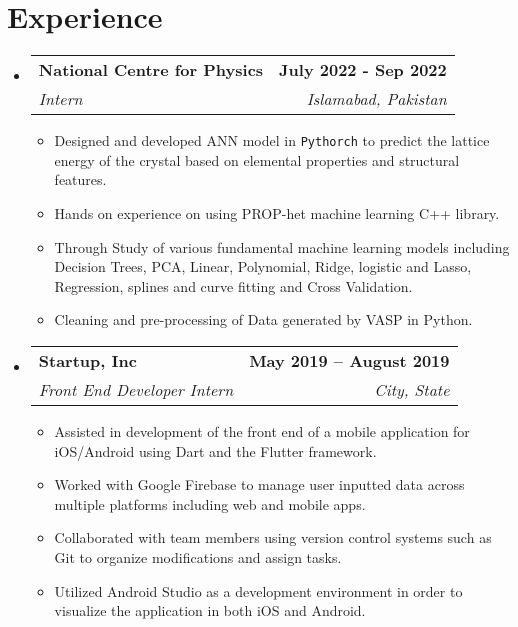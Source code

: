 \documentclass[a4paper,11pt]{article}
\makeatletter
\newcommand{\resumeItem}[1]{
  \item\small{
    {#1 \vspace{-2pt}}
  }
}
\newcommand{\resumeSubheading}[4]{
  \vspace{-2pt}\item
    \begin{tabular*}{1.0\textwidth}[t]{l@{\extracolsep{\fill}}r}
      \textbf{#1} & \textbf{\small #2} \\
      \textit{\small#3} & \textit{\small #4} \\
    \end{tabular*}\vspace{-7pt}
}
\newcommand{\resumeSubHeadingListStart}{\begin{itemize}[leftmargin=0.0in, label={}]}
\newcommand{\resumeSubHeadingListEnd}{\end{itemize}}
\newcommand{\resumeItemListStart}{\begin{itemize}}
\newcommand{\resumeItemListEnd}{\end{itemize}\vspace{-5pt}}
\makeatother
\begin{document}
\section{Experience}
  \resumeSubHeadingListStart

    \resumeSubheading
      {National Centre for Physics}{July 2022 - Sep 2022}
      {Intern}{Islamabad, Pakistan}
      \resumeItemListStart
        \resumeItem{Designed and developed ANN model in \texttt{Pythorch} to predict the lattice energy of the crystal based on elemental properties and structural features.}
        \resumeItem{Hands on experience on using PROP-het machine learning C++ library.}
        \resumeItem{Through Study of various fundamental machine learning models including Decision Trees, PCA, Linear, Polynomial, Ridge, logistic and Lasso, Regression, splines and curve fitting and Cross Validation.}
        \resumeItem{Cleaning and pre-processing of Data generated by VASP in Python.}
      \resumeItemListEnd

    \resumeSubheading
      {Startup, Inc}{May 2019 -- August 2019}
      {Front End Developer Intern}{City, State}
      \resumeItemListStart
        \resumeItem{Assisted in development of the front end of a mobile application for iOS/Android using Dart and the Flutter framework.}
        \resumeItem{Worked with Google Firebase to manage user inputted data across multiple platforms including web and mobile apps.}
        \resumeItem{Collaborated with team members using version control systems such as Git to organize modifications and assign tasks.}
        \resumeItem{Utilized Android Studio as a development environment in order to visualize the application in both iOS and Android.}
    \resumeItemListEnd

  \resumeSubHeadingListEnd
\vspace{-16pt}


\end{document}

